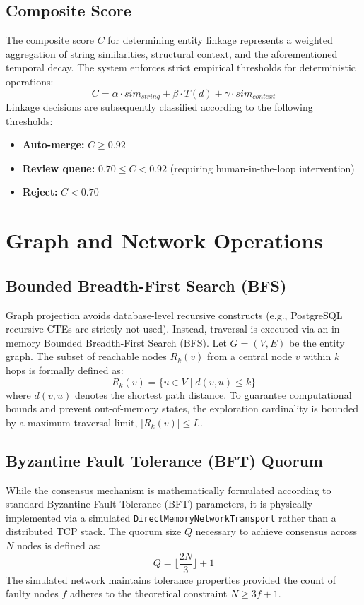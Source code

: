 \subsection{Composite Score}
The composite score $C$ for determining entity linkage represents a weighted aggregation of string similarities, structural context, and the aforementioned temporal decay. The system enforces strict empirical thresholds for deterministic operations:
\begin{equation}
C = \alpha \cdot sim_{string} + \beta \cdot T(d) + \gamma \cdot sim_{context}
\end{equation}
Linkage decisions are subsequently classified according to the following thresholds:
\begin{itemize}
    \item \textbf{Auto-merge:} $C \geq 0.92$
    \item \textbf{Review queue:} $0.70 \leq C < 0.92$ (requiring human-in-the-loop intervention)
    \item \textbf{Reject:} $C < 0.70$
\end{itemize}

\section{Graph and Network Operations}
\subsection{Bounded Breadth-First Search (BFS)}
Graph projection avoids database-level recursive constructs (e.g., PostgreSQL recursive CTEs are strictly not used). Instead, traversal is executed via an in-memory Bounded Breadth-First Search (BFS). Let $G = (V, E)$ be the entity graph. The subset of reachable nodes $R_k(v)$ from a central node $v$ within $k$ hops is formally defined as:
\begin{equation}
R_k(v) = \{ u \in V \mid d(v, u) \leq k \}
\end{equation}
where $d(v, u)$ denotes the shortest path distance. To guarantee computational bounds and prevent out-of-memory states, the exploration cardinality is bounded by a maximum traversal limit, $|R_k(v)| \leq L$.

\subsection{Byzantine Fault Tolerance (BFT) Quorum}
While the consensus mechanism is mathematically formulated according to standard Byzantine Fault Tolerance (BFT) parameters, it is physically implemented via a simulated \texttt{DirectMemoryNetworkTransport} rather than a distributed TCP stack. The quorum size $Q$ necessary to achieve consensus across $N$ nodes is defined as:
\begin{equation}
Q = \lfloor \frac{2N}{3} \rfloor + 1
\end{equation}
The simulated network maintains tolerance properties provided the count of faulty nodes $f$ adheres to the theoretical constraint $N \geq 3f + 1$.


